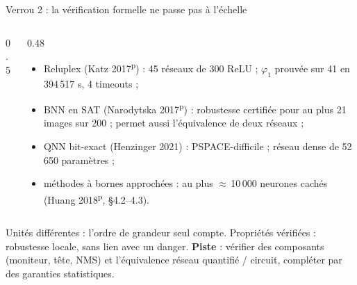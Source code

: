 \documentclass[aspectratio=169,11pt]{beamer}
\newcommand{\pre}{\textsuperscript{\color{acc}p}}
\newcommand{\hc}{\textsuperscript{\color{gray}hc}}
\begin{document}
{\shorthandoff{;}
\begin{frame}{Verrou 2 : la vérification formelle ne passe pas à l'échelle}
  \begin{columns}[c]
    \begin{column}{0.5\textwidth}
    \end{column}
    \begin{column}{0.48\textwidth}
      \scriptsize
      \begin{itemize}
        \item Reluplex (Katz 2017\pre) : 45 réseaux de 300 ReLU ; $\varphi_1$ prouvée sur
              41 en 394\,517 s, 4 timeouts ;
        \item BNN en SAT (Narodytska 2017\pre) : robustesse certifiée pour au plus 21 images
              sur 200 ; permet aussi l'équivalence de deux réseaux ;
        \item QNN bit-exact (Henzinger 2021) : PSPACE-difficile ; réseau dense de 52\,650
              paramètres ;
        \item méthodes à bornes approchées : au plus $\approx$\,10\,000 neurones cachés
              (Huang 2018\pre, §4.2--4.3).
      \end{itemize}
    \end{column}
  \end{columns}

  \vspace{0.4em}
  \small
  Unités différentes : l'ordre de grandeur seul compte. Propriétés vérifiées : robustesse
  locale, sans lien avec un danger. \textbf{Piste} : vérifier des \alert{composants} (moniteur,
  tête, NMS) et l'équivalence réseau quantifié / circuit, compléter par des garanties
  statistiques.
\end{frame}}
\end{document}
